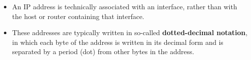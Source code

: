 \begin{itemize}
\item
An IP address is technically associated with an interface, rather than with the host or router containing that interface.

\item
These addresses are typically written in so-called \textbf{dotted-decimal notation}, in which each byte of the address is written in its decimal form and is separated by a period (dot) from other bytes in the address.

















\end{itemize}